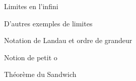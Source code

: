 \documentclass[french,t,handout,xcolor=svgnames]{beamer}
\begin{document}
\begin{frame}{Limites en l'infini}
\end{frame}
\begin{frame}{D'autres exemples de limites}
\end{frame}
\begin{frame}{Notation de Landau et ordre de grandeur}
  


\end{frame}
\begin{frame}{Notion de petit o}
\end{frame}
\begin{frame}{Théorème du Sandwich}
\end{frame}
\end{document}
